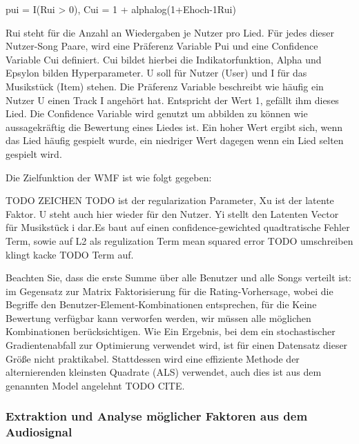 \documentclass[twosided,a4,10pt]{article}
\begin{document}
\begin{multicols}{2}
		pui = I(Rui > 0),
		Cui = 1 + alphalog(1+Ehoch-1Rui)
		
		Rui steht für die Anzahl an Wiedergaben je Nutzer pro Lied. Für jedes dieser Nutzer-Song Paare, wird eine Präferenz Variable Pui und eine Confidence Variable Cui definiert. Cui bildet hierbei die Indikatorfunktion, Alpha und Epsylon bilden Hyperparameter. U soll für Nutzer (User) und I für das Musikstück (Item) stehen. Die Präferenz Variable beschreibt wie häufig ein Nutzer U einen Track I angehört hat. Entspricht der Wert 1, gefällt ihm dieses Lied. Die Confidence Variable wird genutzt um abbilden zu können wie aussagekräftig die Bewertung eines Liedes ist. Ein hoher Wert ergibt sich, wenn das Lied häufig gespielt wurde, ein niedriger Wert dagegen wenn ein Lied selten gespielt wird.
		
		Die Zielfunktion der WMF ist wie folgt gegeben:
		
		TODO ZEICHEN TODO ist der regularization Parameter, Xu ist der latente Faktor. U steht auch hier wieder für den Nutzer. Yi stellt den Latenten Vector für Musikstück i dar.Es baut auf einen confidence-gewichted quadtratische Fehler Term, sowie auf L2 als regulization Term mean squared error TODO umschreiben klingt kacke TODO Term auf.
		
		Beachten Sie, dass die erste Summe über alle Benutzer und alle Songs verteilt ist: im Gegensatz zur Matrix
		Faktorisierung für die Rating-Vorhersage, wobei die Begriffe den Benutzer-Element-Kombinationen entsprechen, für die
		Keine Bewertung verfügbar kann verworfen werden, wir müssen alle möglichen Kombinationen berücksichtigen. Wie
		Ein Ergebnis, bei dem ein stochastischer Gradientenabfall zur Optimierung verwendet wird, ist für einen Datensatz dieser Größe nicht praktikabel. Stattdessen wird eine effiziente Methode der alternierenden kleinsten Quadrate (ALS) verwendet, auch dies ist aus dem genannten Model angelehnt TODO CITE.
		
		
		
		\subsubsection{Extraktion und Analyse möglicher Faktoren aus dem Audiosignal}
		

\end{multicols}
\end{document}
